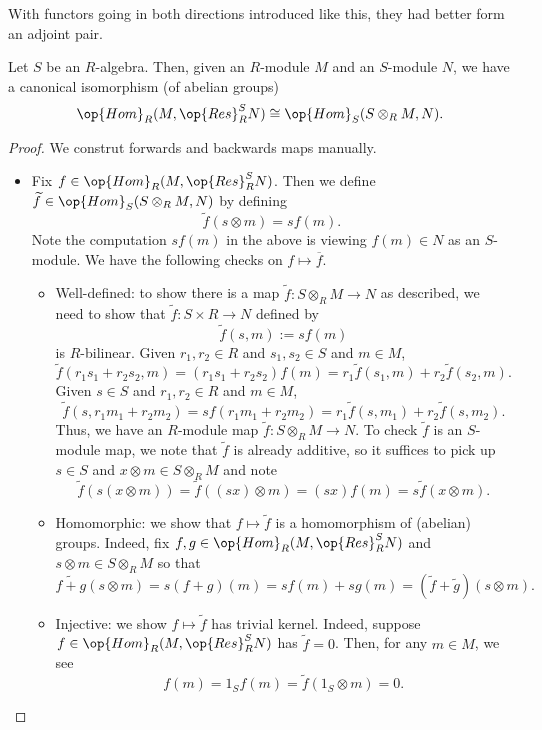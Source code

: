 With functors going in both directions introduced like this, they had better form an adjoint pair.
\begin{proposition}
	Let $S$ be an $R$-algebra. Then, given an $R$-module $M$ and an $S$-module $N$, we have a canonical isomorphism (of abelian groups)
	\[\op{Hom}_R(M,\op{Res}_R^SN)\cong\op{Hom}_S(S\otimes_RM,N).\]
\end{proposition}
\begin{proof}
	We construt forwards and backwards maps manually.
	\begin{itemize}
		\item Fix $f\in\op{Hom}_R(M,\op{Res}_R^SN)$. Then we define $\widetilde f\in\op{Hom}_S(S\otimes_RM,N)$ by defining
		\[\widetilde f(s\otimes m)=sf(m).\]
		Note the computation $sf(m)$ in the above is viewing $f(m)\in N$ as an $S$-module. We have the following checks on $f\mapsto\overline f$.
		\begin{itemize}
			\item Well-defined: to show there is a map $\widetilde f:S\otimes_RM\to N$ as described, we need to show that $\widetilde f:S\times R\to N$ defined by
			\[\widetilde f(s,m):=sf(m)\]
			is $R$-bilinear. Given $r_1,r_2\in R$ and $s_1,s_2\in S$ and $m\in M$,
			\[\widetilde f(r_1s_1+r_2s_2,m)=(r_1s_1+r_2s_2)f(m)=r_1\widetilde f(s_1,m)+r_2\widetilde f(s_2,m).\]
			Given $s\in S$ and $r_1,r_2\in R$ and $m\in M$,
			\[\widetilde f(s,r_1m_1+r_2m_2)=sf(r_1m_1+r_2m_2)=r_1\widetilde f(s,m_1)+r_2\widetilde f(s,m_2).\]
			Thus, we have an $R$-module map $\widetilde f:S\otimes_RM\to N$. To check $\widetilde f$ is an $S$-module map, we note that $\widetilde f$ is already additive, so it suffices to pick up $s\in S$ and $x\otimes m\in S\otimes_RM$ and note
			\[\widetilde f(s(x\otimes m))=\widetilde f((sx)\otimes m)=(sx)f(m)=s\widetilde f(x\otimes m).\]
			\item Homomorphic: we show that $f\mapsto\widetilde f$ is a homomorphism of (abelian) groups. Indeed, fix $f,g\in\op{Hom}_R(M,\op{Res}_R^SN)$ and $s\otimes m\in S\otimes_RM$ so that
			\[\widetilde{f+g}(s\otimes m)=s(f+g)(m)=sf(m)+sg(m)=(\widetilde f+\widetilde g)(s\otimes m).\]
			\item Injective: we show $f\mapsto\widetilde f$ has trivial kernel. Indeed, suppose $f\in\op{Hom}_R(M,\op{Res}_R^SN)$ has $\widetilde f=0$. Then, for any $m\in M$, we see
			\[f(m)=1_Sf(m)=\widetilde f(1_S\otimes m)=0.\]
		\end{itemize}


\end{itemize}
\end{proof}
